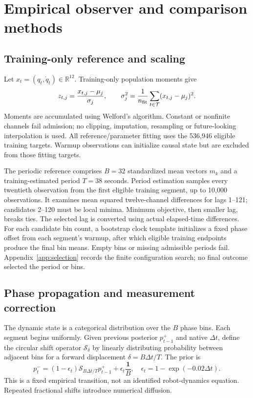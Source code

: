 \section{Empirical observer and comparison methods}
\label{sec:methods}
\subsection{Training-only reference and scaling}
Let $x_t=(q_t,\dot q_t)\in\mathbb R^{12}$. Training-only population moments give
\begin{equation}
 z_{t,j}=\frac{x_{t,j}-\mu_j}{\sigma_j},\qquad
 \sigma_j^2=\frac{1}{n_{\rm fit}}\sum_{t\in\mathcal T}(x_{t,j}-\mu_j)^2.
 \label{eq:scale}
\end{equation}
Moments are accumulated using Welford's algorithm. Constant or nonfinite channels fail admission; no clipping, imputation, resampling or future-looking interpolation is used. All reference/parameter fitting uses the 536,946 eligible training targets. Warmup observations can initialize causal state but are excluded from those fitting targets.

The periodic reference comprises $B=32$ standardized mean vectors $m_k$ and a training-estimated period $T=38$ seconds. Period estimation samples every twentieth observation from the first eligible training segment, up to 10,000 observations. It examines mean squared twelve-channel differences for lags 1--121; candidates 2--120 must be local minima. Minimum objective, then smaller lag, breaks ties. The selected lag is converted using actual elapsed-time differences. For each candidate bin count, a bootstrap clock template initializes a fixed phase offset from each segment's warmup, after which eligible training endpoints produce the final bin means. Empty bins or missing admissible periods fail. Appendix~\ref{app:selection} records the finite configuration search; no final outcome selected the period or bins.

\subsection{Phase propagation and measurement correction}
The dynamic state is a categorical distribution over the $B$ phase bins. Each segment begins uniformly. Given previous posterior $p^+_{t-1}$ and native $\Delta t$, define the circular shift operator $\mathcal S_\delta$ by linearly distributing probability between adjacent bins for a forward displacement $\delta=B\Delta t/T$. The prior is
\begin{equation}
 p^-_t=(1-\epsilon_t)\mathcal S_{B\Delta t/T}p^+_{t-1}
       +\epsilon_t\frac{\mathbf 1}{B},\quad
 \epsilon_t=1-\exp(-0.02\Delta t).
 \label{eq:prior}
\end{equation}
This is a fixed empirical transition, not an identified robot-dynamics equation. Repeated fractional shifts introduce numerical diffusion.

